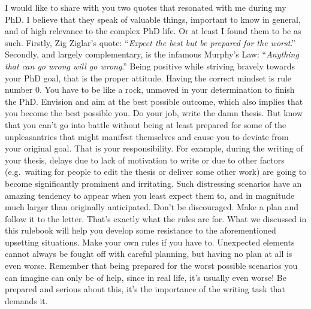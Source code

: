 \documentclass[
  12pt,
  oneside]{book}
\begin{document}
I would like to share with you two quotes that resonated with me during my PhD.
I believe that they speak of valuable things, important to know in general, and of high relevance to the complex PhD life.
Or at least I found them to be as such.
Firstly, Zig Ziglar's quote: ``\emph{Expect the best but be prepared for the worst}.''
Secondly, and largely complementary, is the infamous Murphy's Law: ``\emph{Anything that can go wrong will go wrong}.''
Being positive while striving bravely towards your PhD goal, that is the proper attitude.
Having the correct mindset is rule number 0.
You have to be like a rock, unmoved in your determination to finish the PhD.
Envision and aim at the best possible outcome, which also implies that you become the best possible you.
Do your job, write the damn thesis.
But know that you can't go into battle without being at least prepared for some of the unpleasantries that might manifest themselves and cause you to deviate from your original goal.
That is your responsibility.
For example, during the writing of your thesis, delays due to lack of motivation to write or due to other factors (e.g.~waiting for people to edit the thesis or deliver some other work) are going to become significantly prominent and irritating.
Such distressing scenarios have an amazing tendency to appear when you least expect them to, and in magnitude much larger than originally anticipated.
Don't be discouraged.
Make a plan and follow it to the letter.
That's exactly what the rules are for.
What we discussed in this rulebook will help you develop some resistance to the aforementioned upsetting situations.
Make your own rules if you have to.
Unexpected elements cannot always be fought off with careful planning, but having no plan at all is even worse.
Remember that being prepared for the worst possible scenarios you can imagine can only be of help, since in real life, it's usually even worse!
Be prepared and serious about this, it's the importance of the writing task that demands it.
\end{document}
